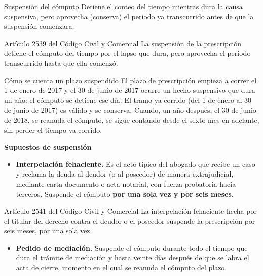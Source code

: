 \documentclass[12pt,oneside]{book}
\begin{document}
\begin{definition}{Suspensión del cómputo}
Detiene el conteo del tiempo mientras dura la causa suspensiva, pero aprovecha (conserva) el período ya transcurrido antes de que la suspensión comenzara.
\end{definition}

\begin{articulo}{Artículo 2539 del Código Civil y Comercial}
La suspensión de la prescripción detiene el cómputo del tiempo por el lapso que dura, pero aprovecha el período transcurrido hasta que ella comenzó.
\end{articulo}

\begin{example}{Cómo se cuenta un plazo suspendido}
El plazo de prescripción empieza a correr el 1 de enero de 2017 y el 30 de junio de 2017 ocurre un hecho suspensivo que dura un año: el cómputo se detiene ese día. El tramo ya corrido (del 1 de enero al 30 de junio de 2017) es válido y se conserva. Cuando, un año después, el 30 de junio de 2018, se reanuda el cómputo, se sigue contando desde el sexto mes en adelante, sin perder el tiempo ya corrido.
\end{example}

\textbf{Supuestos de suspensión}

\begin{itemize}
    \item \textbf{Interpelación fehaciente.} Es el acto típico del abogado que recibe un caso y reclama la deuda al deudor (o al poseedor) de manera extrajudicial, mediante carta documento o acta notarial, con fuerza probatoria hacia terceros. Suspende el cómputo \textbf{por una sola vez y por seis meses}.
\end{itemize}

\begin{articulo}{Artículo 2541 del Código Civil y Comercial}
La interpelación fehaciente hecha por el titular del derecho contra el deudor o el poseedor suspende la prescripción por seis meses, por una sola vez.
\end{articulo}

\begin{itemize}
    \item \textbf{Pedido de mediación.} Suspende el cómputo durante todo el tiempo que dura el trámite de mediación y hasta veinte días después de que se labra el acta de cierre, momento en el cual se reanuda el cómputo del plazo.
\end{itemize}
\end{document}
